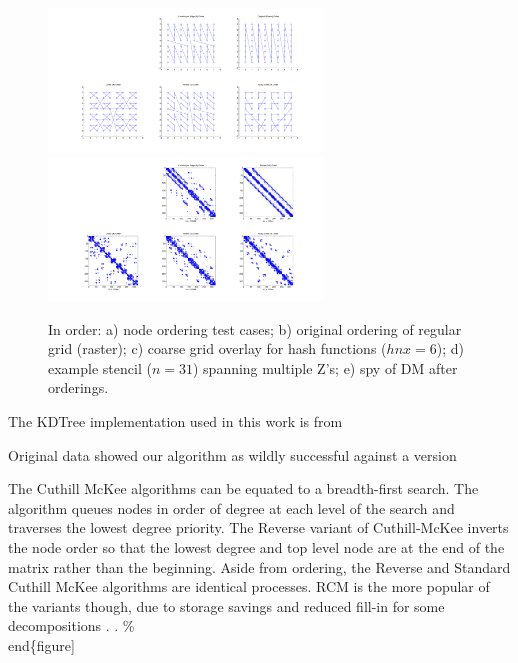 \documentclass[11pt]{report}
\begin{document}
{\begin{figure}
\centering
\includegraphics[width=0.65\textwidth]{rbffd_methods_content/hashing/node_orderings-eps-converted-to.pdf} \\
\includegraphics[width=0.65\textwidth]{rbffd_methods_content/hashing/spy_regulargrid-eps-converted-to.pdf} 
\caption{In order: a) node ordering test cases; b) original ordering of regular grid (raster); c) coarse grid overlay for hash functions ($hnx = 6$); d) example stencil ($n=31$) spanning multiple Z's; e) spy of DM after orderings. }
\label{fig:orderings}
\end{figure}

The KDTree implementation used in this work is from 

Original data showed our algorithm as wildly successful against a version  

The Cuthill McKee algorithms can be equated to a breadth-first search. The algorithm queues nodes in order of degree at each level of the search and traverses the lowest degree priority. The Reverse variant of Cuthill-McKee inverts the node order so that the lowest degree and top level node are at the end of the matrix rather than the beginning. Aside from ordering, the Reverse and Standard Cuthill McKee algorithms are identical processes. RCM is the more popular of the variants though, due to storage savings and reduced fill-in for some decompositions \cite{LiuSherman1976}.	. 
\%\\end\{figure]}
\end{document}
